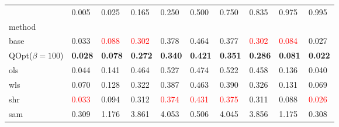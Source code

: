 \begin{tabular}{llllllllll}
\toprule
 & 0.005 & 0.025 & 0.165 & 0.250 & 0.500 & 0.750 & 0.835 & 0.975 & 0.995 \\
method &  &  &  &  &  &  &  &  &  \\
\midrule
base & 0.033 & \textcolor{red}{0.088} & \textcolor{red}{0.302} & 0.378 & 0.464 & 0.377 & \textcolor{red}{0.302} & \textcolor{red}{0.084} & 0.027 \\
\midrule
QOpt($\beta=100$) & \textbf{0.028} & \textbf{0.078} & \textbf{0.272} & \textbf{0.340} & \textbf{0.421} & \textbf{0.351} & \textbf{0.286} & \textbf{0.081} & \textbf{0.022} \\
ols & 0.044 & 0.141 & 0.464 & 0.527 & 0.474 & 0.522 & 0.458 & 0.136 & 0.040 \\
wls & 0.070 & 0.128 & 0.322 & 0.387 & 0.463 & 0.390 & 0.326 & 0.131 & 0.069 \\
shr & \textcolor{red}{0.033} & 0.094 & 0.312 & \textcolor{red}{0.374} & \textcolor{red}{0.431} & \textcolor{red}{0.375} & 0.311 & 0.088 & \textcolor{red}{0.026} \\
sam & 0.309 & 1.176 & 3.861 & 4.053 & 0.506 & 4.045 & 3.856 & 1.175 & 0.308 \\
\bottomrule
\end{tabular}